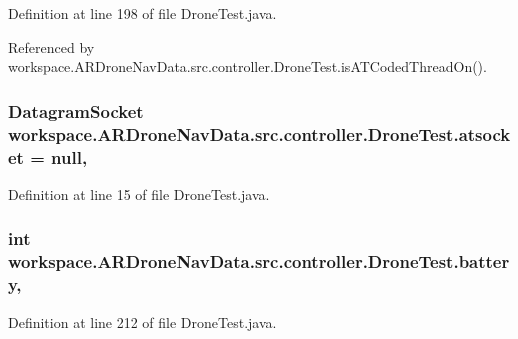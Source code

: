 Definition at line 198 of file Drone\+Test.\+java.



Referenced by workspace.\+A\+R\+Drone\+Nav\+Data.\+src.\+controller.\+Drone\+Test.\+is\+A\+T\+Coded\+Thread\+On().

\hypertarget{classworkspace_1_1_a_r_drone_nav_data_1_1src_1_1controller_1_1_drone_test_a8b8310b826caf0954782ea57f745bdaa}{}
\subsubsection[{atsocket}]{\setlength{\rightskip}{0pt plus 5cm}Datagram\+Socket workspace.\+A\+R\+Drone\+Nav\+Data.\+src.\+controller.\+Drone\+Test.\+atsocket = null\hspace{0.3cm}{\ttfamily [static]}, {\ttfamily [private]}}\label{classworkspace_1_1_a_r_drone_nav_data_1_1src_1_1controller_1_1_drone_test_a8b8310b826caf0954782ea57f745bdaa}


Definition at line 15 of file Drone\+Test.\+java.

\hypertarget{classworkspace_1_1_a_r_drone_nav_data_1_1src_1_1controller_1_1_drone_test_a5c1afa51b8a7209525be502cbcbb2717}{}
\subsubsection[{battery}]{\setlength{\rightskip}{0pt plus 5cm}int workspace.\+A\+R\+Drone\+Nav\+Data.\+src.\+controller.\+Drone\+Test.\+battery\hspace{0.3cm}{\ttfamily [static]}, {\ttfamily [protected]}}\label{classworkspace_1_1_a_r_drone_nav_data_1_1src_1_1controller_1_1_drone_test_a5c1afa51b8a7209525be502cbcbb2717}


Definition at line 212 of file Drone\+Test.\+java.



